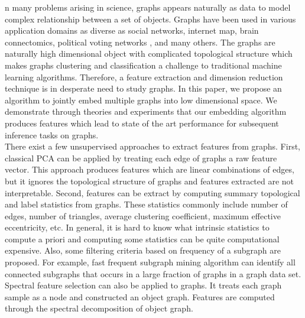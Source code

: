 \documentclass[10pt,journal,compsoc]{IEEEtran}
\begin{document}
\noindent {}n many problems arising in science, graphs appears naturally as data to model complex relationship between a set of objects. Graphs have been used in various application domains as diverse as social networks\cite{otte2002social}, internet map\cite{govindan2000heuristics}, brain connectomics\cite{bullmore2011brain}, political voting networks \cite{ward2011network},  and many others. The graphs are naturally high dimensional object with complicated topological structure which makes graphs clustering and classification a challenge to traditional machine learning algorithms. Therefore, a feature extraction and dimension reduction technique is in desperate need to study graphs. In this paper, we propose an algorithm to jointly embed multiple graphs into low dimensional space. We demonstrate through theories and experiments that our embedding algorithm produces features which lead to state of the art performance for subsequent inference tasks on graphs.  \\

\noindent There exist a few unsupervised approaches to extract features from graphs. First, classical PCA can be applied by treating each edge of graphs a raw feature vector\cite{jolliffe2002principal}. This approach produces features which are linear combinations of edges, but it ignores the topological structure of graphs and features extracted are not interpretable. Second, features can be extract by computing summary topological and label statistics from graphs\cite{li2011graph}. These statistics commonly include number of edges, number of triangles, average clustering coefficient, maximum effective eccentricity, etc. In general, it is hard to know what intrinsic statistics to compute a priori and computing some statistics can be quite computational expensive. Also, some filtering criteria based on frequency of a subgraph are proposed. For example, fast frequent subgraph mining algorithm can identify all connected subgraphs that occurs in a large fraction of graphs in a graph data set\cite{huan2003efficient}. Spectral feature selection can also be applied to graphs. It treats each graph sample as a node and constructed an object graph. Features are computed through the spectral decomposition of object graph\cite{zhao2007spectral}. \\
\end{document}
